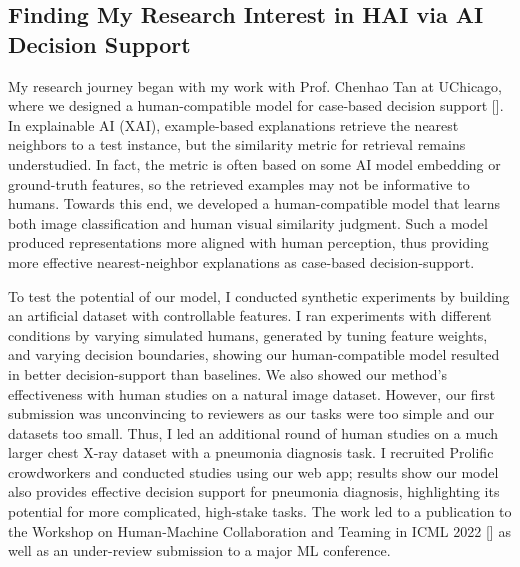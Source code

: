 \subsection*{Finding My Research Interest in HAI via AI Decision Support}






My research journey began with my work with Prof. Chenhao Tan at UChicago, where we designed a human-compatible model for case-based decision support 
[]. 
In explainable AI (XAI), example-based explanations retrieve the nearest neighbors to a test instance, but the similarity metric for retrieval remains understudied. In fact, the metric is often based on some AI model embedding or ground-truth features, so the retrieved examples may not be informative to humans. Towards this end, we developed a human-compatible model that learns both image classification and human visual similarity judgment. 
Such a model produced representations more aligned with human perception, thus providing more effective nearest-neighbor explanations as case-based decision-support.



To test the potential of our model, I conducted synthetic experiments by building an artificial dataset with controllable features. I ran experiments with different conditions by varying simulated humans, generated by tuning feature weights, and varying decision boundaries, showing our human-compatible model resulted in better decision-support than baselines. We also showed our method's effectiveness with human studies on a natural image dataset. However, our first submission was unconvincing to reviewers as our tasks were too simple and our datasets too small. Thus, I led an additional round of human studies on a much larger chest X-ray dataset with a pneumonia diagnosis task. I recruited Prolific crowdworkers and conducted studies using our web app; results show our model also provides effective decision support for pneumonia diagnosis, highlighting its potential for more complicated, high-stake tasks. 
The work led to a publication to the Workshop on Human-Machine Collaboration and Teaming in ICML 2022 [] as well as an under-review submission to a major ML conference.


